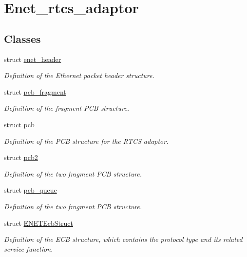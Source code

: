 \hypertarget{group__enet__rtcs__adaptor}{}\section{Enet\+\_\+rtcs\+\_\+adaptor}
\label{group__enet__rtcs__adaptor}
\subsection*{Classes}
\begin{DoxyCompactItemize}
\item 
struct \hyperlink{structenet__header}{enet\+\_\+header}
\begin{DoxyCompactList}\small\item\em Definition of the Ethernet packet header structure. \end{DoxyCompactList}\item 
struct \hyperlink{structpcb__fragment}{pcb\+\_\+fragment}
\begin{DoxyCompactList}\small\item\em Definition of the fragment P\+CB structure. \end{DoxyCompactList}\item 
struct \hyperlink{structpcb}{pcb}
\begin{DoxyCompactList}\small\item\em Definition of the P\+CB structure for the R\+T\+CS adaptor. \end{DoxyCompactList}\item 
struct \hyperlink{structpcb2}{pcb2}
\begin{DoxyCompactList}\small\item\em Definition of the two fragment P\+CB structure. \end{DoxyCompactList}\item 
struct \hyperlink{structpcb__queue}{pcb\+\_\+queue}
\begin{DoxyCompactList}\small\item\em Definition of the two fragment P\+CB structure. \end{DoxyCompactList}\item 
struct \hyperlink{structENETEcbStruct}{E\+N\+E\+T\+Ecb\+Struct}
\begin{DoxyCompactList}\small\item\em Definition of the E\+CB structure, which contains the protocol type and it\textquotesingle{}s related service function. \end{DoxyCompactList}\item 

\end{DoxyCompactItemize}
